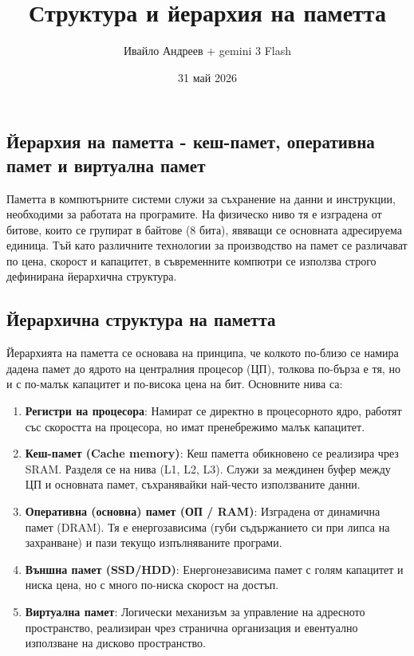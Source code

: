 \documentclass{scrartcl}
\title{Структура и йерархия на паметта}
\author{Ивайло Андреев + gemini 3 Flash}
\date{31 май 2026}
\begin{document}
\maketitle

\tableofcontents
\newpage

\begin{FlushLeft}

\section{Йерархия на паметта - кеш-памет, оперативна памет и виртуална памет}

Паметта в компютърните системи служи за съхранение на данни и инструкции, необходими за работата на програмите. На физическо ниво тя е изградена от битове, които се групират в байтове (8 бита), явяващи се основната адресируема единица. Тъй като различните технологии за производство на памет се различават по цена, скорост и капацитет, в съвременните компютри се използва строго дефинирана йерархична структура.

\subsection{Йерархична структура на паметта}
Йерархията на паметта се основава на принципа, че колкото по-близо се намира дадена памет до ядрото на централния процесор (ЦП), толкова по-бърза е тя, но и с по-малък капацитет и по-висока цена на бит. Основните нива са:
\begin{enumerate}
    \item \textbf{Регистри на процесора}: Намират се директно в процесорното ядро, работят със скоростта на процесора, но имат пренебрежимо малък капацитет.
    \item \textbf{Кеш-памет (Cache memory)}: Кеш паметта обикновено се реализира чрез SRAM. Разделя се на нива (L1, L2, L3). Служи за междинен буфер между ЦП и основната памет, съхранявайки най-често използваните данни.
    \item \textbf{Оперативна (основна) памет (ОП / RAM)}: Изградена от динамична памет (DRAM). Тя е енергозависима (губи съдържанието си при липса на захранване) и пази текущо изпълняваните програми.
    \item \textbf{Външна памет (SSD/HDD)}: Енергонезависима памет с голям капацитет и ниска цена, но с много по-ниска скорост на достъп.
    \item \textbf{Виртуална памет}: Логически механизъм за управление на адресното пространство, реализиран чрез странична организация и евентуално използване на дисково пространство.
\end{enumerate}


\end{FlushLeft}
\end{document}
